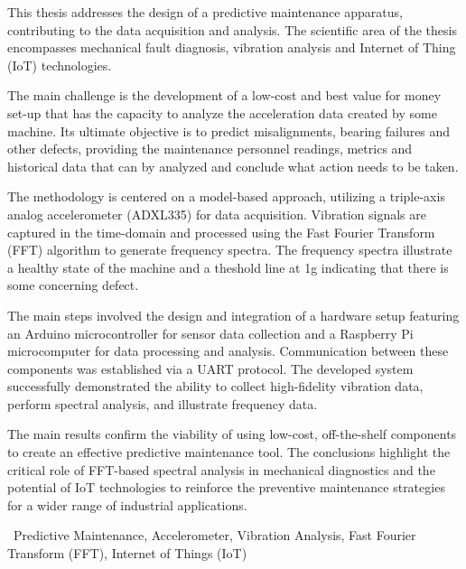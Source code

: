 
\begin{abstracteng}
	
	This thesis addresses the design of a predictive maintenance apparatus, contributing to the data acquisition and analysis. The scientific area of the thesis encompasses mechanical fault diagnosis, vibration analysis and Internet of Thing (IoT) technologies.
	
	The main challenge is the development of a low-cost and best value for money set-up that has the capacity to analyze the acceleration data created by some machine. Its ultimate objective is to predict misalignments, bearing failures and other defects, providing the maintenance personnel readings, metrics and historical data that can by analyzed and conclude what action needs to be taken.
	
	The methodology is centered on a model-based approach, utilizing a triple-axis analog accelerometer (ADXL335) for data acquisition. Vibration signals are captured in the time-domain and processed using the Fast Fourier Transform (FFT) algorithm to generate frequency spectra. The frequency spectra illustrate a healthy state of the machine and a theshold line at 1g indicating that there is some concerning defect.
	
	The main steps involved the design and integration of a hardware setup featuring an Arduino microcontroller for sensor data collection and a Raspberry Pi microcomputer for data processing and analysis. Communication between these components was established via a UART protocol. The developed system successfully demonstrated the ability to collect high-fidelity vibration data, perform spectral analysis, and illustrate frequency data.
	
	The main results confirm the viability of using low-cost, off-the-shelf components to create an effective predictive maintenance tool. The conclusions highlight the critical role of FFT-based spectral analysis in mechanical diagnostics and the potential of IoT technologies to reinforce the preventive maintenance strategies for a wider range of industrial applications.
	
	\vspace*{\fill}
	\
	Predictive Maintenance, Accelerometer, Vibration Analysis, Fast Fourier Transform (FFT), Internet of Things (IoT)
\end{abstracteng}